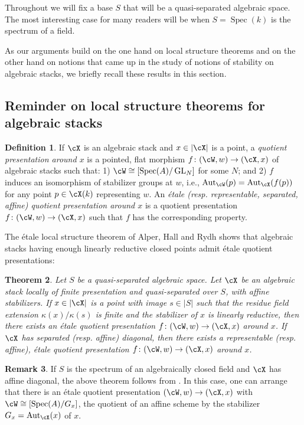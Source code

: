 \documentclass[a4paper]{amsart}
\numberwithin{equation}{section}
\theoremstyle{plain}
\newtheorem{thm}{Theorem}[section]
\theoremstyle{definition}
\newtheorem{remark}[thm]{Remark}
\newtheorem{defn}[thm]{Definition}
\DeclareMathOperator{\Spec}{Spec}
\DeclareMathOperator{\GL}{GL}
\DeclareMathOperator{\Aut}{Aut}
\newcommand{\co}{\colon}
\begin{document}
Throughout we will fix a base $S$ that will be a quasi-separated algebraic space. The most interesting case for many readers will be when $S=\Spec(k)$ is the spectrum of a field.

As our arguments build on the one hand on local structure theorems and on the other hand on notions that came up in the study of notions of stability on algebraic stacks, we briefly recall these results in this section. 



\subsection{Reminder on local structure theorems for algebraic stacks}

\begin{defn} \label{D:local-quotient-presentation} If $\cX$ is an algebraic stack and $x \in |\cX|$ is a point, a \emph{quotient presentation around $x$} is a pointed, flat morphism 	
	$f \co (\cW, w) \to (\cX,x)$ of algebraic stacks such that: 1) $\cW \cong [\Spec(A)/ \GL_N]$ for some $N$; and 2) $f$ induces an isomorphism of stabilizer groups at $w$, i.e., $\Aut_\cW(p) = \Aut_\cX(f(p))$ for any point $p \in \cX(k)$ representing $w$. An \emph{\'etale (resp. representable, separated, affine) quotient presentation around $x$} is a quotient presentation $f \co (\cW, w) \to (\cX,x)$ such that $f$ has the corresponding property.
\end{defn}

The \'etale local structure theorem of Alper, Hall and Rydh shows that algebraic stacks having enough linearly reductive closed points admit \'etale quotient presentations:

\begin{thm} \label{T:ahr} \cite[Thm.~1.1]{ahr2} Let $S$ be a quasi-separated algebraic space.  Let $\cX$ be an algebraic stack locally of finite presentation and quasi-separated over $S$, with affine stabilizers. If $x \in |\cX|$ is a point with image $s \in |S|$ such that the residue field extension $\kappa(x)/\kappa(s)$ is finite and the stabilizer of $x$ is linearly reductive, then there exists an \'etale quotient presentation $f \co (\cW, w) \to (\cX,x)$ around $x$. If $\cX$ has separated (resp. affine) diagonal, then there exists a representable (resp. affine), \'etale quotient presentation $f \co (\cW, w) \to (\cX,x)$ around $x$.
\end{thm}

\begin{remark} If $S$ is the spectrum of an algebraically closed field and $\cX$ has affine diagonal, the above theorem follows from \cite[Thm.~1.2]{ahr}.  In this case, one can arrange that there is an \'etale quotient presentation $(\cW,w) \to (\cX,x)$ with $\cW \cong [\Spec(A) / G_x]$, the quotient of an affine scheme by the stabilizer $G_x = \Aut_{\cX}(x)$ of $x$.
\end{remark}
\end{document}
